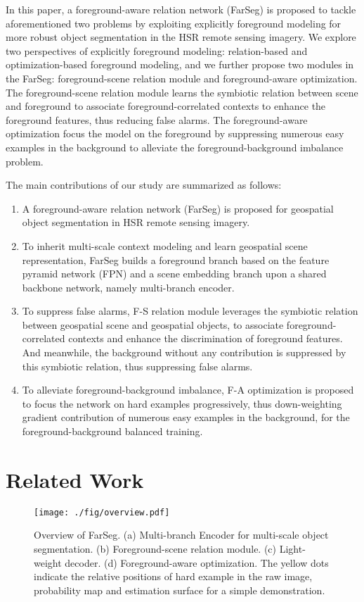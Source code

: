 \documentclass[10pt,twocolumn,letterpaper]{article}
\begin{document}
In this paper, a foreground-aware relation network (FarSeg) is proposed to tackle aforementioned two problems by exploiting explicitly foreground modeling for more robust object segmentation in the HSR remote sensing imagery.
We explore two perspectives of explicitly foreground modeling: relation-based and optimization-based foreground modeling, and we further propose two modules in the FarSeg: foreground-scene relation module and foreground-aware optimization.
The foreground-scene relation module learns the symbiotic relation between scene and foreground to associate foreground-correlated contexts to enhance the foreground features, thus reducing false alarms.
The foreground-aware optimization focus the model on the foreground by suppressing numerous easy examples in the background to alleviate the foreground-background imbalance problem.

The main contributions of our study are summarized as follows:
\begin{enumerate}
   \item A foreground-aware relation network (FarSeg) is proposed for geospatial object segmentation in HSR remote sensing imagery.
   \item To inherit multi-scale context modeling and learn geospatial scene representation, FarSeg builds a foreground branch based on the feature pyramid network (FPN) and a scene embedding branch upon a shared backbone network, namely multi-branch encoder.
   \item To suppress false alarms, F-S relation module leverages the symbiotic relation between geospatial scene and geospatial objects, to associate foreground-correlated contexts and enhance the discrimination of foreground features. And meanwhile, the background without any contribution is suppressed by this symbiotic relation, thus suppressing false alarms.
   \item To alleviate foreground-background imbalance, F-A optimization is proposed to focus the network on hard examples progressively, thus down-weighting gradient contribution of numerous easy examples in the background, for the foreground-background balanced training.
\end{enumerate}




\section{Related Work}
\label{sec:related_work}

\begin{figure*}
   \begin{center}
      \texttt{[image: ./fig/overview.pdf]}
   \end{center}
   \caption{Overview of FarSeg.
      (a) Multi-branch Encoder for multi-scale object segmentation.
      (b) Foreground-scene relation module.
      (c) Light-weight decoder.
      (d) Foreground-aware optimization. The yellow dots indicate the relative positions of hard example in the raw image, probability map and estimation surface for a simple demonstration.}
   \label{fig:overview}
\end{figure*}
\end{document}
